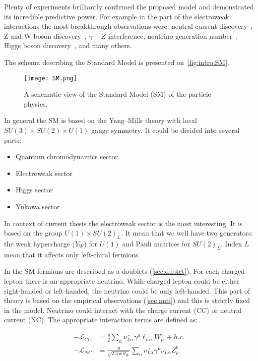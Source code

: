 \documentclass[../main.tex]{subfiles}
\begin{document}
Plenty of experiments brilliantly confirmed the proposed model and demonstrated its incredible predictive power. For example in the part of the electroweak interactions the most breakthrough observations were: neutral current discovery~\cite{Cundy1974}, Z and W boson discovery~\cite{Arnison1983}, $\gamma-Z$ interference, neutrino generation number~\cite{Arnison1983}, Higgs boson discovery~\cite{Aad2012}, and many others.

The schema describing the Standard Model is presented on~\autoref{fig:intro:SM}.

\begin{figure}[!ht]
    \centering
    \texttt{[image: SM.png]}
    \caption{A schematic view of the Standard Model (SM) of the particle physics.}
    \label{fig:intro:SM}
\end{figure}

In general the SM is based on the Yang–Mills theory with local $SU(3)\times SU(2)\times U(1)$ gauge symmetry. It could be divided into several parts:
\begin{itemize}
  \item Quantum chromodynamics sector
  \item Electroweak sector
  \item Higgs sector
  \item Yukawa sector
\end{itemize}

In context of current thesis the electroweak sector is the most interesting. It is based on the group $U(1)\times SU(2)_L$. It mean that we well have two generators: the weak hypercharge ($Y_W$) for $U(1)$ and Pauli matrices for $SU(2)_L$. Index $L$ mean that it affects only left-chiral fermions.

In the SM fermions are described as a doublets (\autoref{sec:dublet}). For each charged lepton there is an appropriate neutrino. While charged lepton could be either right-handed or left-handed, the neutrino could be only left-handed. This part of theory is based on the empirical observations (\autoref{sec:anti}) and this is strictly fixed in the model. Neutrino could interact with the charge current (CC) or neutral current (NC). The appropriate interaction terms are defined as:

\begin{align}
-\mathcal{L}_{CC}&=\frac{g}{2}\sum_\alpha\bar{\nu_{L\alpha}}\gamma^\mu\ell_{L\alpha}W^+_\mu+h.c. \\ \nonumber
-\mathcal{L}_{NC}&=\frac{g}{\sqrt{2\cos{\theta_W}}}\sum_\alpha\bar{\nu_{L\alpha}}\gamma^\mu\nu_{L\alpha}Z^0_\mu
\end{align}
\end{document}

